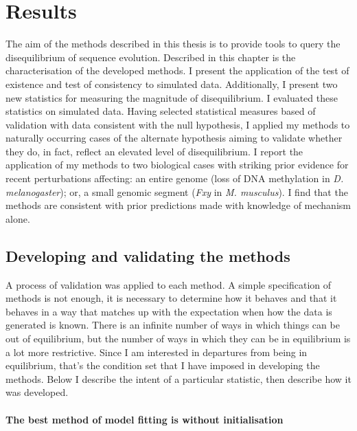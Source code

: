 \chapter{Results}


The aim of the methods described in this thesis is to provide tools to query the disequilibrium of sequence evolution. Described in this chapter is the characterisation of the developed methods. I present the application of the test of existence and test of consistency to simulated data. Additionally, I present two new statistics for measuring the magnitude of disequilibrium. I evaluated these statistics on simulated data. Having selected statistical measures based of validation with data consistent with the null hypothesis, I applied my methods to naturally occurring cases of the alternate hypothesis aiming to validate whether they do, in fact, reflect an elevated level of disequilibrium. I report the application of my methods to two biological cases with striking prior evidence for recent perturbations affecting: an entire genome (loss of DNA methylation in \textit{D. melanogaster}); or, a small genomic segment (\textit{Fxy} in \textit{M. musculus}). I find that the methods are consistent with prior predictions made with knowledge of mechanism alone.  

\section{Developing and validating the methods}


A process of validation was applied to each method. A simple specification of methods is not enough, it is necessary to determine how it behaves and that it behaves in a way that matches up with the expectation when how the data is generated is known. There is an infinite number of ways in which things can be out of equilibrium, but the number of ways in which they can be in equilibrium is a lot more restrictive. Since I am interested in departures from being in equilibrium, that’s the condition set that I have imposed in developing the methods. Below I describe the intent of a particular statistic, then describe how it was developed.

\subsubsection*{The best method of model fitting is without initialisation}

